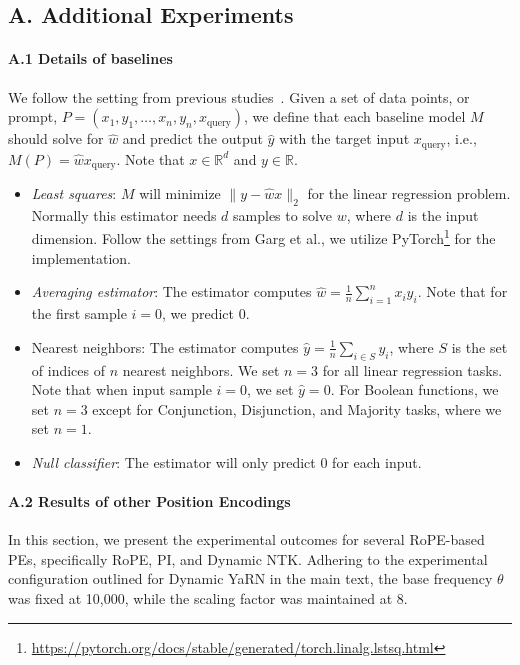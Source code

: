 \documentclass[letterpaper]{article} %
\begin{document}
\subsection{A. Additional Experiments}
\paragraph{A.1 Details of baselines}

We follow the setting from previous studies~\cite{garg-2022-what, bhattamishra-2024-understanding}. Given a set of data points, or prompt, $P = (x_1, y_1, \ldots, x_n, y_n, x_{\text{query}})$, we define that each baseline model $M$ should solve for $\hat{w}$ and predict the output $\hat{y}$ with the target input $x_{\text{query}}$, i.e., $M(P) = \hat{w} x_{\text{query}}$. Note that $x \in \mathbb{R}^d$ and $y \in \mathbb{R}$.

\begin{itemize}
    \item \textit{Least squares}: $M$ will minimize $\| y - \hat{w}x \|_2$ for the linear regression problem. Normally this estimator needs $d$ samples to solve $w$, where $d$ is the input dimension. Follow the settings from Garg et al., we utilize  PyTorch\footnote{\url{https://pytorch.org/docs/stable/generated/torch.linalg.lstsq.html}} for the implementation.
    \item \textit{Averaging estimator}: The estimator computes $\hat{w} = \frac{1}{n} \sum_{i=1}^{n} x_iy_i$. Note that for the first sample $i = 0$, we predict $0$.
    \item Nearest neighbors: The estimator computes $\hat{y} = \frac{1}{n} \sum_{i \in S} y_i$, where $S$ is the set of indices of $n$ nearest neighbors. We set $n = 3$ for all linear regression tasks. Note that when input sample $i = 0$, we set $\hat{y} = 0$. For Boolean functions, we set $n=3$ except for Conjunction, Disjunction, and Majority tasks, where we set $n=1$.
    \item \textit{Null classifier}: The estimator will only predict 0 for each input.
\end{itemize}

\paragraph{A.2 Results of other Position Encodings}
In this section, we present the experimental outcomes for several RoPE-based PEs, specifically RoPE, PI, and Dynamic NTK. Adhering to the experimental configuration outlined for Dynamic YaRN in the main text, the base frequency $\theta$ was fixed at 10,000, while the scaling factor was maintained at $8$.
\end{document}
